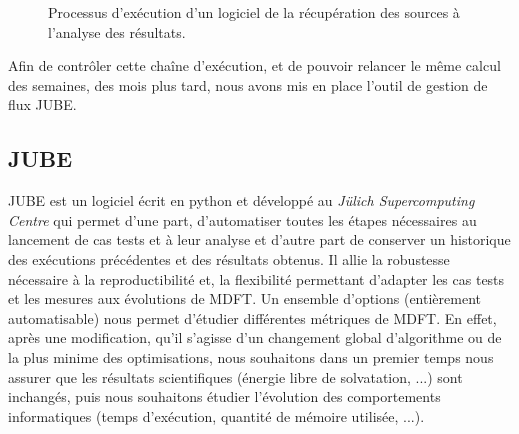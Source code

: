 \begin{figure}[H]
  \center
  \caption{Processus d'exécution d'un logiciel de la récupération des sources à l'analyse des résultats.}
  \label{fig:JUBE_process}
\end{figure}

Afin de contrôler cette chaîne d’exécution, et de pouvoir relancer le même calcul des semaines, des mois plus tard, nous avons mis en place l’outil de gestion de flux JUBE\cite{Luhrs_parallel_2016,Galonska_advances_2012}.

\subsection{JUBE}
JUBE est un logiciel écrit en python et développé au \textit{Jülich Supercomputing Centre} qui permet d'une part, d'automatiser toutes les étapes nécessaires au lancement de cas tests et à leur analyse et d'autre part de conserver un historique des exécutions précédentes et des résultats obtenus. Il allie la robustesse nécessaire à la reproductibilité et, la flexibilité permettant d'adapter les cas tests et les mesures aux évolutions de MDFT. Un ensemble d'options (entièrement automatisable) nous permet d'étudier différentes métriques de MDFT. En effet, après une modification, qu'il s'agisse d'un changement global d'algorithme ou de la plus minime des optimisations, nous souhaitons dans un premier temps nous assurer que les résultats scientifiques (\'energie libre de solvatation, ...) sont inchangés, puis nous souhaitons étudier l'évolution des comportements informatiques (temps d'exécution, quantité de mémoire utilisée, ...).

